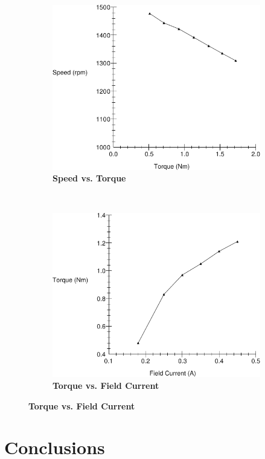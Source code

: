 \documentclass{article}
\begin{document}
\begin{figure}[H]
  \centering
  \begin{subfigure}[b]{0.45\textwidth}
    \includegraphics[width=\textwidth]{img/plot4}
    \caption{\textbf{Speed vs. Torque}}
    \label{fig:plot4}
  \end{subfigure}~%
%
  \begin{subfigure}[b]{0.45\textwidth}
    \includegraphics[width=\textwidth]{img/plot5}
    \caption{\textbf{Torque vs. Field Current}}
    \label{fig:plot5}
  \end{subfigure}
\end{figure}

\section*{Conclusions}

\end{document}

